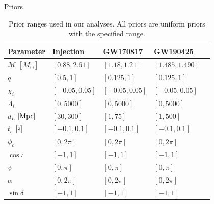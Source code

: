 \documentclass[usenames,dvipsnames,t]{beamer}
\begin{document}
\begin{frame}{Priors}
  
  \begin{table}
    \caption{Prior ranges used in our analyses. All priors are uniform priors with the specified range.}
    \label{tab:parameter_priors}
    \renewcommand{\arraystretch}{1}
      \begin{tabular}{l l l l l}
    \hline \hline
    Parameter  & Injection & GW170817 & GW190425 \\ \hline
    $\mathcal{M}$ $[M_\odot]$ & $[0.88, 2.61]$ & $[1.18, 1.21]$ & $[1.485, 1.490]$ \\
    $q$ & $[0.5, 1]$ & $[0.125, 1]$ & $[0.125, 1]$ \\ 
    $\chi_i$ & $[-0.05, 0.05]$ & $[-0.05, 0.05]$ & $[-0.05, 0.05]$ \\
    $\Lambda_i$ & $[0, 5000]$ & $[0, 5000]$ & $[0, 5000]$ \\
    $d_L$ $[\rm{Mpc}]$ & $[30, 300]$ & $[1, 75]$ & $[1, 500]$ \\
    $t_c$ $[\rm{s}]$ & $[-0.1, 0.1]$ & $[-0.1, 0.1]$ & $[-0.1, 0.1]$ \\
    $\phi_c$ & $[0, 2\pi]$ & $[0, 2\pi]$ & $[0, 2\pi]$ \\
    $\cos \iota$ & $[-1, 1]$ & $[-1, 1]$ & $[-1, 1]$ \\
    $\psi$ & $[0, \pi]$ & $[0, \pi]$ & $[0, \pi]$ \\
    $\alpha$ & $[0, 2\pi]$ & $[0, 2\pi]$ & $[0, 2\pi]$ \\
    $\sin \delta$ & $[-1, 1]$ & $[-1, 1]$ & $[-1, 1]$ \\
    \hline \hline
    \end{tabular}
\end{table}
\end{frame}
\end{document}
